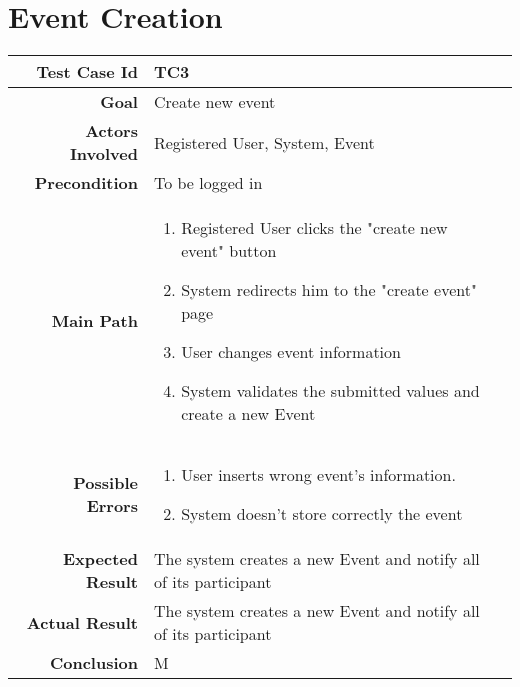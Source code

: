 \section{Event Creation}
\begin{tabularx}{\linewidth}{|r|X|X|}

  \hline   {\bf Test Case Id} &  TC3\\
  \hline  {\bf Goal} & Create new event\\
  \hline  {\bf Actors Involved} & Registered User, System, Event\\
  \hline  {\bf Precondition} & To be logged in\\ 
   \hline  {\bf Main Path} & \begin{enumerate} 
   \item Registered User clicks the "create new event" button
   \item System redirects him to the "create event" page
   \item User changes event information
    \item System validates the submitted values and create a new Event
   \end{enumerate}\\
   \hline  {\bf Possible Errors} & \begin{enumerate} 
   \item User inserts wrong event's information.
   \item System doesn't store correctly the event
   \end{enumerate}\\
  \hline  {\bf Expected Result} & The system creates a new Event and notify all of its participant\\
  \hline  {\bf Actual Result} & The system creates a new Event and notify all of its participant\\
  \hline  {\bf Conclusion} & M\\
  \hline
  
\end{tabularx}
